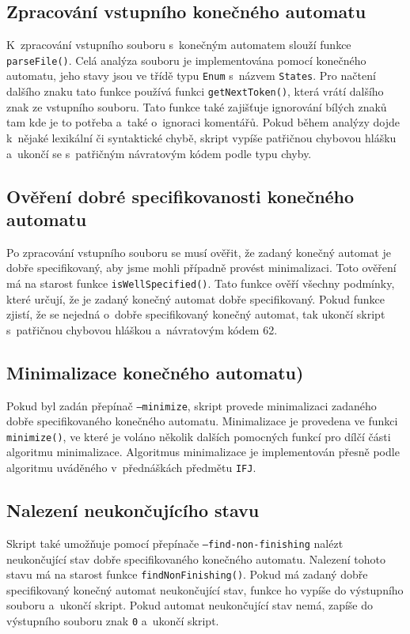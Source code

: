 \documentclass[a4paper, 10pt]{article}
\begin{document}
\subsection{Zpracování vstupního konečného automatu}
K~zpracování vstupního souboru s~konečným automatem slouží funkce \texttt{parseFile()}. Celá analýza souboru je implementována pomocí konečného automatu, jeho stavy jsou ve třídě typu \texttt{Enum} s~názvem \texttt{States}. Pro načtení dalšího znaku tato funkce používá funkci \texttt{getNextToken()}, která vrátí dalšího znak ze vstupního souboru. Tato funkce také zajišťuje ignorování bílých znaků tam kde je to potřeba a~také o~ignoraci komentářů. Pokud během analýzy dojde k~nějaké lexikální či syntaktické chybě, skript vypíše patřičnou chybovou hlášku a~ukončí se s~patřičným návratovým kódem podle typu chyby. 

\subsection{Ověření dobré specifikovanosti konečného automatu}
Po zpracování vstupního souboru se musí ověřit, že zadaný konečný automat je dobře specifikovaný, aby jsme mohli případně provést minimalizaci. Toto ověření má na starost funkce \texttt{isWellSpecified()}. Tato funkce ověří všechny podmínky, které určují, že je zadaný konečný automat dobře specifikovaný. Pokud funkce zjistí, že se nejedná o~dobře specifikovaný konečný automat, tak ukončí skript s~patřičnou chybovou hláškou a~návratovým kódem 62.

\subsection{Minimalizace konečného automatu)}
Pokud byl zadán přepínač \texttt{--minimize}, skript provede minimalizaci zadaného dobře specifikovaného konečného automatu. Minimalizace je provedena ve funkci \texttt{minimize()}, ve které je voláno několik dalších pomocných funkcí pro dílčí části algoritmu minimalizace. Algoritmus minimalizace je implementován přesně podle algoritmu uváděného v~přednáškách předmětu \texttt{IFJ}.

\subsection{Nalezení neukončujícího stavu}
Skript také umožňuje pomocí přepínače \texttt{--find-non-finishing} nalézt neukončující stav dobře specifikovaného konečného automatu. Nalezení tohoto stavu má na starost funkce \texttt{findNonFinishing()}. Pokud má zadaný dobře specifikovaný konečný automat neukončující stav, funkce ho vypíše do výstupního souboru a~ukončí skript. Pokud automat neukončující stav nemá, zapíše do výstupního souboru znak \texttt{0} a~ukončí skript.
\end{document}

